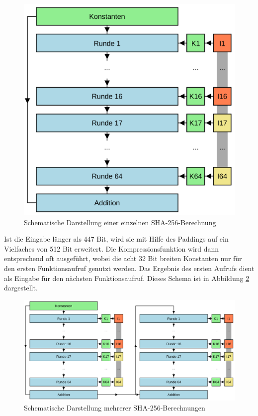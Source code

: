 \begin{figure}[!h]
  \centering
  \includegraphics[scale=0.4]{images/sha256single}
  \caption{Schematische Darstellung einer einzelnen SHA-256-Berechnung}
  \label{fig:sha256single}
\end{figure}

Ist die Eingabe länger als 447 Bit, wird sie mit Hilfe des Paddings auf ein Vielfaches von 512 Bit erweitert. Die Kompressionsfunktion wird dann entsprechend oft
ausgeführt, wobei die acht 32 Bit breiten Konstanten nur für den ersten Funktionsaufruf genutzt werden. Das Ergebnis des ersten Aufrufs dient als Eingabe für
den nächsten Funktionsaufruf. Dieses Schema ist in Abbildung \ref{fig:sha256multi} dargestellt.

\begin{figure}[!h]
  \centering
  \includegraphics[scale=0.4]{images/sha256multi}
  \caption{Schematische Darstellung mehrerer SHA-256-Berechnungen}
  \label{fig:sha256multi}
\end{figure}





